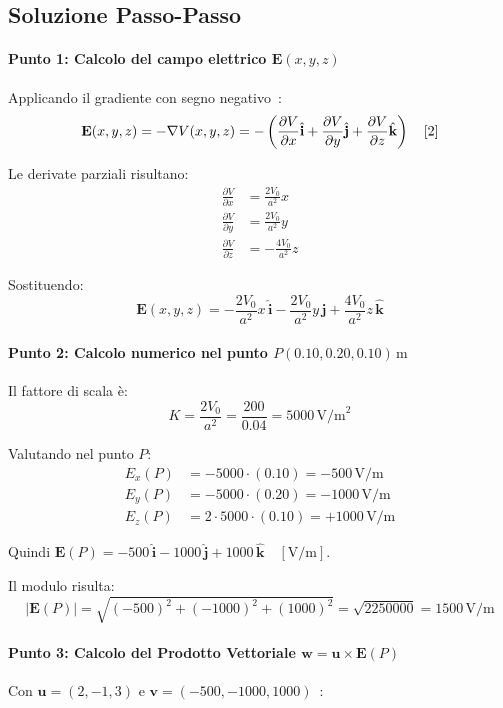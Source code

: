 \documentclass[12pt, a4paper]{article}
\begin{document}
\subsection{Soluzione Passo-Passo}

\paragraph{Punto 1: Calcolo del campo elettrico $\mathbf{E}(x,y,z)$}
Applicando il gradiente con segno negativo~\cite{2}:
\[
\mathbf{E}(x,y,z) = -\nabla V(x,y,z) = -\left( \frac{\partial V}{\partial x} \hat{\mathbf{i}} + \frac{\partial V}{\partial y} \hat{\mathbf{j}} + \frac{\partial V}{\partial z} \hat{\mathbf{k}} \right) \quad \text{\cite{2}}
\]

Le derivate parziali risultano:
\begin{align*}
\frac{\partial V}{\partial x} &= \frac{2 V_0}{a^2} x \\
\frac{\partial V}{\partial y} &= \frac{2 V_0}{a^2} y \\
\frac{\partial V}{\partial z} &= -\frac{4 V_0}{a^2} z
\end{align*}

Sostituendo:
\[
\mathbf{E}(x,y,z) = -\frac{2 V_0}{a^2} x \, \hat{\mathbf{i}} - \frac{2 V_0}{a^2} y \, \hat{\mathbf{j}} + \frac{4 V_0}{a^2} z \, \hat{\mathbf{k}}
\]

\paragraph{Punto 2: Calcolo numerico nel punto $P(0.10, 0.20, 0.10) \, \text{m}$}
Il fattore di scala è:
\[
K = \frac{2 V_0}{a^2} = \frac{200}{0.04} = 5000 \, \text{V/m}^2
\]

Valutando nel punto $P$:
\begin{align*}
E_x(P) &= -5000 \cdot (0.10) = -500 \, \text{V/m} \\
E_y(P) &= -5000 \cdot (0.20) = -1000 \, \text{V/m} \\
E_z(P) &= 2 \cdot 5000 \cdot (0.10) = +1000 \, \text{V/m}
\end{align*}

Quindi $\mathbf{E}(P) = -500 \, \hat{\mathbf{i}} - 1000 \, \hat{\mathbf{j}} + 1000 \, \hat{\mathbf{k}} \quad [\text{V/m}]$.

Il modulo risulta:
\[
|\mathbf{E}(P)| = \sqrt{(-500)^2 + (-1000)^2 + (1000)^2} = \sqrt{2250000} = 1500 \, \text{V/m}
\]

\paragraph{Punto 3: Calcolo del Prodotto Vettoriale $\mathbf{w} = \mathbf{u} \times \mathbf{E}(P)$}
Con $\mathbf{u} = (2, -1, 3)$ e $\mathbf{v} = (-500, -1000, 1000)$~\cite{1}:
\end{document}
